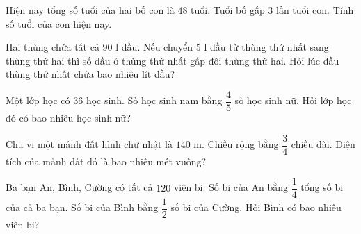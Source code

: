 \begin{ex} %
Hiện nay tổng số tuổi của hai bố con là $48$ tuổi. Tuổi bố gấp $3$ lần tuổi con. Tính số tuổi của con hiện nay.
\end{ex}

\begin{ex} %
Hai thùng chứa tất cả $90\text{ l}$ dầu. Nếu chuyển $5\text{ l}$ dầu từ thùng thứ nhất sang thùng thứ hai thì số dầu ở thùng thứ nhất gấp đôi thùng thứ hai. Hỏi lúc đầu thùng thứ nhất chứa bao nhiêu lít dầu?
\end{ex}

\begin{ex} %
Một lớp học có $36$ học sinh. Số học sinh nam bằng $\dfrac{4}{5}$ số học sinh nữ. Hỏi lớp học đó có bao nhiêu học sinh nữ?
\end{ex}

\begin{ex} %
Chu vi một mảnh đất hình chữ nhật là $140\text{ m}$. Chiều rộng bằng $\dfrac{3}{4}$ chiều dài. Diện tích của mảnh đất đó là bao nhiêu mét vuông?
\end{ex}

\begin{ex} %
Ba bạn An, Bình, Cường có tất cả $120$ viên bi. Số bi của An bằng $\dfrac{1}{4}$ tổng số bi của cả ba bạn. Số bi của Bình bằng $\dfrac{1}{2}$ số bi của Cường. Hỏi Bình có bao nhiêu viên bi?
\end{ex}
